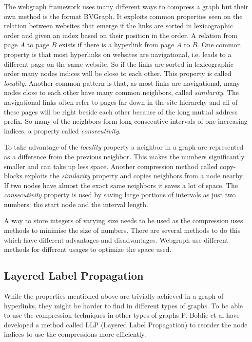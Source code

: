 The webgraph framework\cite{webgraph} uses many different ways to compress a graph but their own method is the format BVGraph. It exploits common properties seen on the relation between websites that emerge if the links are sorted in lexicographic order and given an index based on their position in the order. A relation from page $A$ to page $B$ exists if there is a hyperlink from page $A$ to $B$. One common property is that most hyperlinks on websites are navigational, i.e. leads to a different page on the same website. So if the links are sorted in lexicographic order many nodes indices will be close to each other. This property is called \emph{locality}. Another common pattern is that, as most links are navigational, many nodes close to each other have many common neighbors, called \emph{similarity}. The navigational links often refer to pages far down in the site hierarchy and all of these pages will be right beside each other because of the long mutual address prefix. So many of the neighbors form long consecutive intervals of one-increasing indices, a property called \emph{consecutivity}. \cite{webgraph-compression}

To take advantage of the \emph{locality} property a neighbor in a graph are represented as a difference from the previous neighbor. This makes the numbers significantly smaller and can take up less space. Another compression method called copy-blocks exploits the \emph{similarity} property and copies neighbors from a node nearby. If two nodes have almost the exact same neighbors it saves a lot of space. The \emph{consecutivity} property is used by saving large portions of intervals as just two numbers: the start node and the interval length. \cite{webgraph-compression}

A way to store integers of varying size needs to be used as the compression uses methods to minimise the size of numbers. There are several methods to do this which have different advantages and disadvantages. Webgraph use different methods for different usages to optimize the space used. \cite{webgraph-compression}

\subsection{Layered Label Propagation}

While the properties mentioned above are trivially achieved in a graph of hyperlinks, they might be harder to find in different types of graphs. To be able to use the compression techniques in other types of graphs P. Boldie et al have developed a method called LLP (Layered Label Propagation) to reorder the node indices to use the compressions more efficiently. \cite{llp} 

